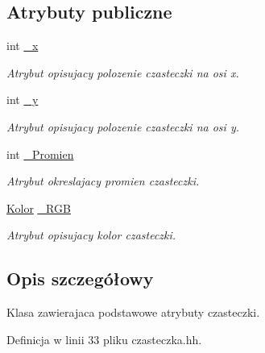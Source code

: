 \subsection*{Atrybuty publiczne}
\begin{DoxyCompactItemize}
\item 
int \hyperlink{class_czasteczka_af809cd4fb1651ebf4b5980ee38c68e58}{\-\_\-x}
\begin{DoxyCompactList}\small\item\em Atrybut opisujacy polozenie czasteczki na osi x. \end{DoxyCompactList}\item 
int \hyperlink{class_czasteczka_a285d25465eee101b6af073809e2fee00}{\-\_\-y}
\begin{DoxyCompactList}\small\item\em Atrybut opisujacy polozenie czasteczki na osi y. \end{DoxyCompactList}\item 
int \hyperlink{class_czasteczka_a5a1d126d89bd571c79a5691c45e2f469}{\-\_\-\-Promien}
\begin{DoxyCompactList}\small\item\em Atrybut okreslajacy promien czasteczki. \end{DoxyCompactList}\item 
\hyperlink{class_kolor}{Kolor} \hyperlink{class_czasteczka_ab9c93cfb3cf0360579ad0def2a94178c}{\-\_\-\-R\-G\-B}
\begin{DoxyCompactList}\small\item\em Atrybut opisujacy kolor czasteczki. \end{DoxyCompactList}\end{DoxyCompactItemize}


\subsection{Opis szczegółowy}
Klasa zawierajaca podstawowe atrybuty czasteczki. 

Definicja w linii 33 pliku czasteczka.\-hh.



